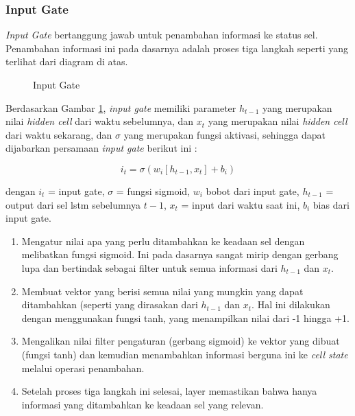 \documentclass[./skripsi.tex]{subfiles}
\begin{document}
\subsubsection{Input Gate}\label{lstm:inputgate}
\par \textit{Input Gate} bertanggung jawab untuk penambahan informasi ke status sel. Penambahan informasi ini pada dasarnya adalah proses tiga langkah seperti yang terlihat dari diagram di atas.

\begin{figure}[H]
    \centering
    \caption{Input Gate}
    \label{fig:inputgate1.png}
\end{figure}

\par Berdasarkan Gambar \ref{fig:inputgate1.png}, \textit{input gate} memiliki parameter $h_{t-1}$ yang merupakan nilai \textit{hidden cell} dari waktu sebelumnya, dan $x_t$ yang merupakan nilai \textit{hidden cell} dari waktu sekarang, dan $\sigma$ yang merupakan fungsi aktivasi, sehingga dapat dijabarkan persamaan \textit{input gate} berikut ini :

\begin{equation}
    i_t = \sigma (w_i[h_{t-1},x_t] + b_i)
    \label{eq:lstm_input_gate}
\end{equation}
\par dengan $i_t$ = input gate, $\sigma$ = fungsi sigmoid, $w_i$ bobot dari input gate, $h_{t-1}$ = output dari sel lstm sebelumnya $t-1$, $x_t$ = input dari waktu saat ini, $b_i$ bias dari input gate.

\begin{enumerate}
    \item Mengatur nilai apa yang perlu ditambahkan ke keadaan sel dengan melibatkan fungsi sigmoid. Ini pada dasarnya sangat mirip dengan gerbang lupa dan bertindak sebagai filter untuk semua informasi dari $h_{t-1}$ dan $x_{t}$.
    \item Membuat vektor yang berisi semua nilai yang mungkin yang dapat ditambahkan (seperti yang dirasakan dari $h_{t-1}$ dan $x_t$. Hal ini dilakukan dengan menggunakan fungsi tanh, yang menampilkan nilai dari -1 hingga +1.
    \item Mengalikan nilai filter pengaturan (gerbang sigmoid) ke vektor yang dibuat (fungsi tanh) dan kemudian menambahkan informasi berguna ini ke \textit{cell state} melalui operasi penambahan.
    \item Setelah proses tiga langkah ini selesai, layer memastikan bahwa hanya informasi yang ditambahkan ke keadaan sel yang relevan.
\end{enumerate}
\end{document}
